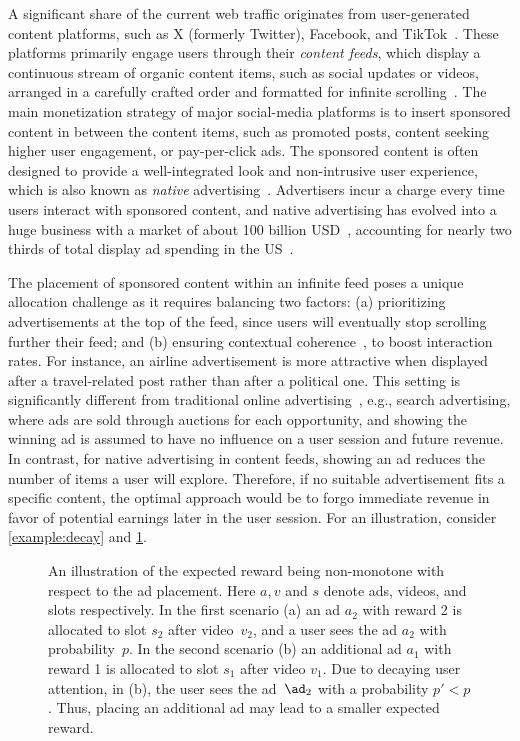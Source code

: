 
A significant share of the current web traffic originates from user-generated content platforms,
such as X (formerly Twitter), Facebook, and TikTok~\cite{Alhabash2017Socials}.
These platforms primarily engage users through their \emph{content feeds}, 
which display a continuous stream of organic content items, 
such as social updates or videos,
arranged in a carefully crafted order and formatted for infinite scrolling~\citep{Milano2020Recc}.
The main monetization strategy of major social-media platforms is to insert sponsored content in between the content items, 
such as promoted posts, content seeking higher user engagement, 
or pay-per-click ads. 
The sponsored content is often designed to provide a well-integrated look and non-intrusive user experience, 
which is also known as \emph{native} advertising~\citep{wojdynski2016native}.
Advertisers incur a charge every time users interact with sponsored content, and
native advertising has evolved into a huge business with a market of
about 100 billion USD~\citep{stats2,stats3},
accounting for nearly two thirds of total display ad spending in the US~\citep{stats4}.


The placement of sponsored content within an infinite feed poses a unique allocation challenge
as it requires balancing two factors: 
(a) prioritizing advertisements at the top of the feed,
since users will eventually stop scrolling further %
their feed;
and (b) ensuring contextual coherence~\citep{yoon2023native},
to boost interaction rates. 
For instance, an airline advertisement is more attractive when displayed after a travel-related post rather than after a political one.
This setting is significantly different from traditional online advertising~\citep{mehta2013online,devanur2022online},
e.g., search advertising, 
where ads are sold through auctions for each opportunity, and
showing the winning ad is assumed to have no influence on a user session and future revenue.
In contrast, for native advertising in content feeds, 
showing an ad reduces the number of items a user will explore. %
Therefore, if no suitable advertisement fits a specific content, the optimal approach would be to forgo immediate revenue in favor of potential earnings later in the user session. %
For an illustration, consider \cref{example:decay} and \cref{fig:decay}.

\begin{figure}[t]
	\centering
	
	\subcaptionbox{ }{ %
		
	}
	\hfill
	\subcaptionbox{ }{ %
		
	}
	\caption{\label{fig:decay}An illustration of the expected reward being non-monotone 
	with respect to the 
	ad placement.
	Here $a,v$ and $s$ denote ads, videos, and slots respectively.
	In the first scenario (a) an ad $a_2$ with reward 2 is allocated to slot $s_2$ after video~$v_2$, 
	and a user sees the ad $a_2$ with probability~$p$.
	In the second scenario (b) an additional ad $a_1$ with reward 1 is allocated to slot $s_1$ after video $v_1$.  
	Due to decaying user attention, 
	in (b), %
	the user sees the ad~$\ad_2$ with a probability $p'<p$. 
	Thus, placing an additional ad may lead to a smaller expected reward.}
\end{figure}


